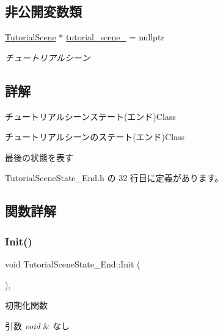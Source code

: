 \subsection*{非公開変数類}
\begin{DoxyCompactItemize}
\item 
\mbox{\hyperlink{class_tutorial_scene}{Tutorial\+Scene}} $\ast$ \mbox{\hyperlink{class_tutorial_scene_state___end_a68f36e80b530182a5b5d835425b7e829}{tutorial\+\_\+scene\+\_\+}} = nullptr
\begin{DoxyCompactList}\small\item\em チュートリアルシーン \end{DoxyCompactList}\end{DoxyCompactItemize}


\subsection{詳解}
チュートリアルシーンステート(エンド)Class 

チュートリアルシーンのステート(エンド)Class

最後の状態を表す 

 Tutorial\+Scene\+State\+\_\+\+End.\+h の 32 行目に定義があります。



\subsection{関数詳解}
\mbox{\label{class_tutorial_scene_state___end_a572e5687140ff5ac43789f90462c05a5}} 
\subsubsection{\texorpdfstring{Init()}{Init()}}
{\footnotesize\ttfamily void Tutorial\+Scene\+State\+\_\+\+End\+::\+Init (\begin{DoxyParamCaption}{ }\end{DoxyParamCaption})\hspace{0.3cm}{\ttfamily [override]}, {\ttfamily [virtual]}}



初期化関数 


\begin{DoxyParams}{引数}
{\em void} & なし \\
\hline
\end{DoxyParams}

